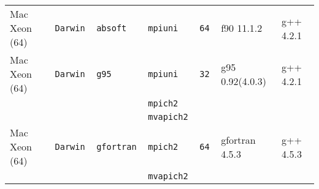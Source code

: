 \begin{longtable}{lllllll}
Mac Xeon (64)         &\tt Darwin &\tt absoft       &\tt mpiuni     &\tt 64              & f90 \footnotesize 11.1.2            & g++ \footnotesize 4.2.1         \\ %
Mac Xeon (64)         &\tt Darwin &\tt g95          &\tt mpiuni     &\tt 32              & g95 \footnotesize 0.92(4.0.3)       & g++ \footnotesize 4.2.1         \\ %
                      &           &                 &\tt mpich2     &                    &                                    &                                 \\
                      &           &                 &\tt mvapich2   &                    &                                    &                                 \\
Mac Xeon (64)         &\tt Darwin &\tt gfortran     &\tt mpich2     &\tt 64              & gfortran \footnotesize 4.5.3       & g++ \footnotesize 4.5.3         \\ %
                      &           &                 &\tt mvapich2   &                    &                                    &                                 \\

\end{longtable}
